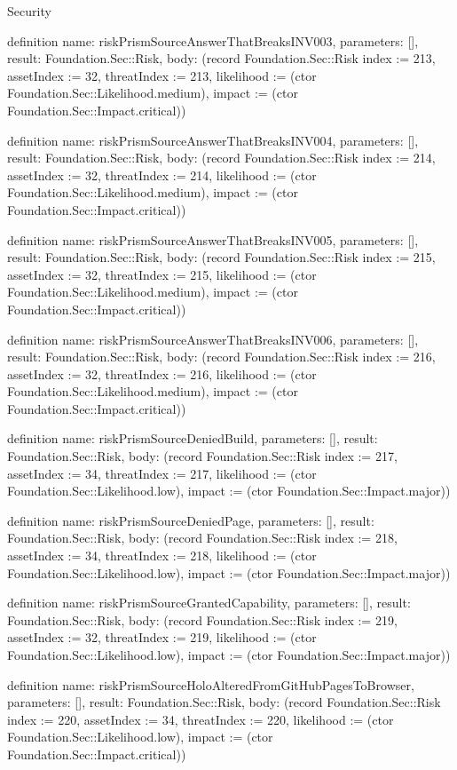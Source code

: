 \begin{lexlean}{Security}
\begin{semanticmodule}
definition{
  name: riskPrismSourceAnswerThatBreaksINV003,
  parameters: [],
  result: Foundation.Sec::Risk,
  body: (record Foundation.Sec::Risk {index := 213, assetIndex := 32, threatIndex := 213, likelihood := (ctor Foundation.Sec::Likelihood.medium), impact := (ctor Foundation.Sec::Impact.critical)})
}

definition{
  name: riskPrismSourceAnswerThatBreaksINV004,
  parameters: [],
  result: Foundation.Sec::Risk,
  body: (record Foundation.Sec::Risk {index := 214, assetIndex := 32, threatIndex := 214, likelihood := (ctor Foundation.Sec::Likelihood.medium), impact := (ctor Foundation.Sec::Impact.critical)})
}

definition{
  name: riskPrismSourceAnswerThatBreaksINV005,
  parameters: [],
  result: Foundation.Sec::Risk,
  body: (record Foundation.Sec::Risk {index := 215, assetIndex := 32, threatIndex := 215, likelihood := (ctor Foundation.Sec::Likelihood.medium), impact := (ctor Foundation.Sec::Impact.critical)})
}

definition{
  name: riskPrismSourceAnswerThatBreaksINV006,
  parameters: [],
  result: Foundation.Sec::Risk,
  body: (record Foundation.Sec::Risk {index := 216, assetIndex := 32, threatIndex := 216, likelihood := (ctor Foundation.Sec::Likelihood.medium), impact := (ctor Foundation.Sec::Impact.critical)})
}

definition{
  name: riskPrismSourceDeniedBuild,
  parameters: [],
  result: Foundation.Sec::Risk,
  body: (record Foundation.Sec::Risk {index := 217, assetIndex := 34, threatIndex := 217, likelihood := (ctor Foundation.Sec::Likelihood.low), impact := (ctor Foundation.Sec::Impact.major)})
}

definition{
  name: riskPrismSourceDeniedPage,
  parameters: [],
  result: Foundation.Sec::Risk,
  body: (record Foundation.Sec::Risk {index := 218, assetIndex := 34, threatIndex := 218, likelihood := (ctor Foundation.Sec::Likelihood.low), impact := (ctor Foundation.Sec::Impact.major)})
}

definition{
  name: riskPrismSourceGrantedCapability,
  parameters: [],
  result: Foundation.Sec::Risk,
  body: (record Foundation.Sec::Risk {index := 219, assetIndex := 32, threatIndex := 219, likelihood := (ctor Foundation.Sec::Likelihood.low), impact := (ctor Foundation.Sec::Impact.major)})
}

definition{
  name: riskPrismSourceHoloAlteredFromGitHubPagesToBrowser,
  parameters: [],
  result: Foundation.Sec::Risk,
  body: (record Foundation.Sec::Risk {index := 220, assetIndex := 34, threatIndex := 220, likelihood := (ctor Foundation.Sec::Likelihood.low), impact := (ctor Foundation.Sec::Impact.critical)})
}


\end{semanticmodule}
\end{lexlean}
